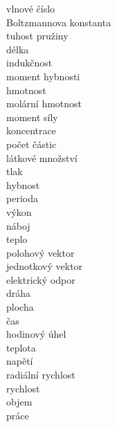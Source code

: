  vlnové číslo\\
 Boltzmannova konstanta\\
 tuhost pružiny\\
 délka\\
 indukčnost\\
 moment hybnosti\\
 hmotnost\\
 molární hmotnost\\
 moment síly\\
 koncentrace\\
 počet částic\\
 látkové množství\\
 tlak\\
 hybnost\\
 perioda\\
 výkon\\
 náboj\\
 teplo\\
 polohový vektor\\
 jednotkový vektor\\
 elektrický odpor\\
 dráha\\
 plocha\\
 čas\\
 hodinový úhel\\
 teplota\\
 napětí\\
 radiální rychlost\\
 rychlost\\
 objem\\
 práce\\

\s{}{} \\

